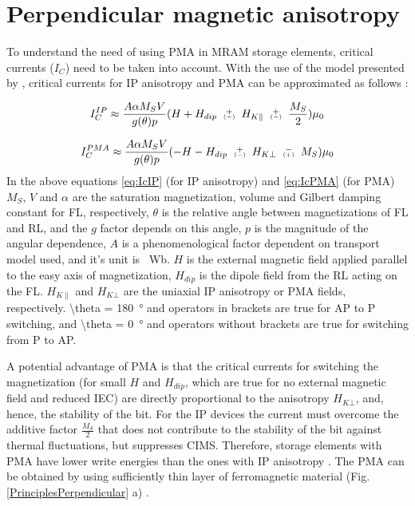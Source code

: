 \section{Perpendicular magnetic anisotropy} \label{sec:PrinciplesAdditionalPerpendicular}

    To understand the need of using PMA in MRAM storage elements, critical currents ($I_C$) need to be taken into account. With the use of the model presented by \citeauthor{mangin2006current}, critical currents for IP anisotropy and PMA can be approximated as follows \cite{mangin2006current}:
    
    \begin{equation} \label{eq:IcIP}
		I_C^{IP}\approx \frac{A\alpha M_SV}{g(\theta)p}(H+H_{dip}\varpm H_{K\parallel}\varpm \frac{M_S}{2})\mu_0
	\end{equation}
	
	\begin{equation} \label{eq:IcPMA}
		I_C^{PMA}\approx \frac{A\alpha M_SV}{g(\theta)p}(-H-H_{dip}\varpm H_{K\bot}\varmp M_S)\mu_0
	\end{equation}
In the above equations \ref{eq:IcIP} (for IP anisotropy) and \ref{eq:IcPMA} (for PMA) $M_S$, $V$ and $\alpha$ are the saturation magnetization, volume and Gilbert damping constant for FL, respectively, $\theta$ is the relative angle between magnetizations of FL and RL, and the $g$ factor depends on this angle, $p$ is the magnitude of the angular dependence, $A$ is a phenomenological factor dependent on transport model used, and it's unit is \si{\per\weber}. $H$ is the external magnetic field applied parallel to the easy axis of magnetization, $H_{dip}$ is the dipole field from the RL acting on the FL. $H_{K\parallel}$ and $H_{K\bot}$ are the uniaxial IP anisotropy or PMA fields, respectively. \SI[parse-numbers = false, number-math-rm = \ensuremath]{\theta = 180}{\degree} and operators in brackets are true for AP to P switching, and \SI[parse-numbers = false, number-math-rm = \ensuremath]{\theta = 0}{\degree} and operators without brackets are true for switching from P to AP.
    
    A potential advantage of PMA is that the critical currents for switching the magnetization (for small $H$ and $H_{dip}$, which are true for no external magnetic field and reduced IEC) are directly proportional to the anisotropy $H_{K\bot}$, and, hence, the stability of the bit. For the IP devices the current must overcome the additive factor $\frac{M_S}{2}$ that does not contribute to the stability of the bit against thermal fluctuations, but suppresses CIMS. Therefore, storage elements with PMA have lower write energies than the ones with IP anisotropy \cite{kishi2008lower,frankowski2015buffer}. The PMA can be obtained by using sufficiently thin layer of ferromagnetic material (Fig. \ref{PrinciplesPerpendicular} a) \cite{kisielewski2004wide}.
    
